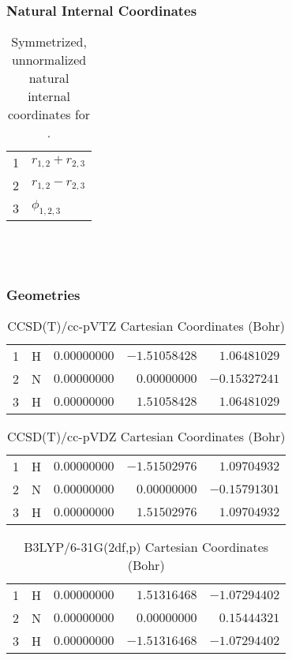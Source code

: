 \documentclass[10pt,oneside]{article}
\begin{document}
\clearpage

\subsubsection*{Natural Internal Coordinates}
\begin{table}[h!]
\centering
\caption{Symmetrized, unnormalized natural internal coordinates for .}
\small
\begin{tabular}{ll}
  1   & $r_{1,2} + r_{2,3}$ \\
  2   & $r_{1,2} - r_{2,3}$ \\
  3   & $\phi_{1,2,3}$ \\
\end{tabular}
\end{table}

\clearpage

\subsection{\ \ \ }

\subsubsection*{Geometries}
\begin{table}[h!]
\centering
\caption{CCSD(T)/cc-pVTZ Cartesian Coordinates (Bohr)}
\begin{tabular}{llrrr}
1  & H  & $ 0.00000000$ & $-1.51058428$ & $ 1.06481029$ \\
2  & N  & $ 0.00000000$ & $ 0.00000000$ & $-0.15327241$ \\
3  & H  & $ 0.00000000$ & $ 1.51058428$ & $ 1.06481029$ \\
\end{tabular}
\end{table}

\begin{table}[h!]
\centering
\caption{CCSD(T)/cc-pVDZ Cartesian Coordinates (Bohr)}
\begin{tabular}{llrrr}
1  & H  & $ 0.00000000$ & $-1.51502976$ & $ 1.09704932$ \\
2  & N  & $ 0.00000000$ & $ 0.00000000$ & $-0.15791301$ \\
3  & H  & $ 0.00000000$ & $ 1.51502976$ & $ 1.09704932$ \\
\end{tabular}
\end{table}

\begin{table}[h!]
\centering
\caption{B3LYP/6-31G(2df,p) Cartesian Coordinates (Bohr)}
\begin{tabular}{llrrr}
1  & H  & $ 0.00000000$ & $ 1.51316468$ & $-1.07294402$ \\
2  & N  & $ 0.00000000$ & $ 0.00000000$ & $ 0.15444321$ \\
3  & H  & $ 0.00000000$ & $-1.51316468$ & $-1.07294402$ \\
\end{tabular}
\end{table}
\end{document}
